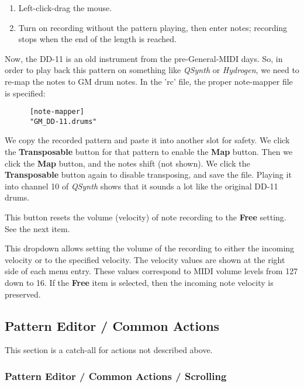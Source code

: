 \begin{itemize}
   \begin{enumerate}
      \item Left-click-drag the mouse.
      \item Turn on recording without the pattern playing, then
         enter notes; recording stops when the end of the length is reached.
   \end{enumerate}

   Now, the DD-11 is an old instrument from the pre-General-MIDI days.
   So, in order to play back this pattern on something like
   \textsl{QSynth} or \textsl{Hydrogen}, we need to re-map the notes to GM drum
   notes.  In the 'rc' file, the proper note-mapper file is specified:

   \begin{verbatim}
      [note-mapper]
      "GM_DD-11.drums"
   \end{verbatim}

   We copy the recorded pattern and paste it into another slot for safety.
   We click the \textbf{Transposable} button for that pattern to enable the
   \textbf{Map} button.  Then we click the \textbf{Map} button, and the notes
   shift (not shown).  
   We click the \textbf{Transposable} button again to disable transposing,
   and save the file.
   Playing it into channel 10 of \textsl{QSynth} shows that it sounds a lot
   like the original DD-11 drums.

   This button resets the volume (velocity)
   of note recording to the \textbf{Free} setting.
   See the next item.

   This dropdown allows setting the volume of the recording to either the
   incoming velocity or to the specified velocity.
   The velocity values are shown at the right side of each menu entry.
   These values correspond to MIDI volume levels from 127 down to 16.
   If the \textbf{Free} item is selected, then the incoming note velocity is
   preserved.

\subsection{Pattern Editor / Common Actions}
\label{subsec:pattern_editor_common}

   This section is a catch-all for actions not described above.

\subsubsection{Pattern Editor / Common Actions / Scrolling}
\label{subsec:pattern_editor_scrolling}


\end{itemize}
